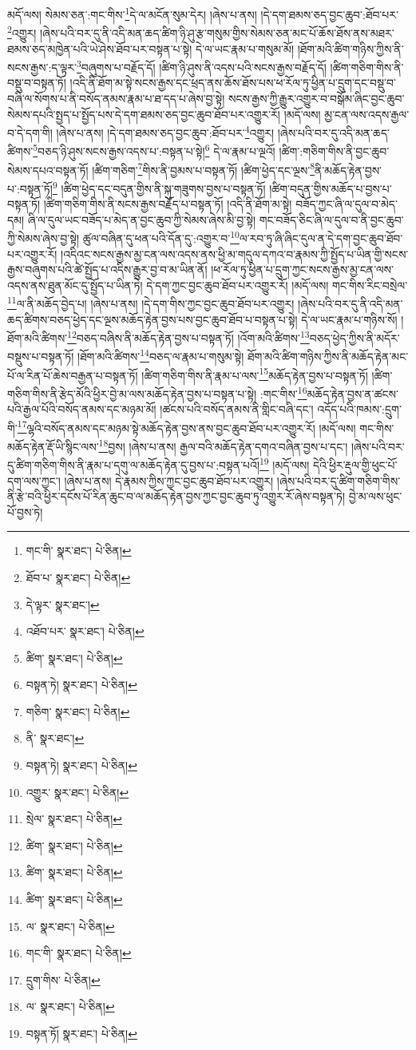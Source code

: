 མདོ་ལས། སེམས་ཅན་:གང་གིས་\footnote{གང་གི་  སྣར་ཐང་།  པེ་ཅིན། }དེ་ལ་མངོན་སུམ་དེར། །ཞེས་པ་ནས། །དེ་དག་ཐམས་ཅད་བྱང་ཆུབ་:ཐོབ་པར་\footnote{ཐོབ་པ་  སྣར་ཐང་།  པེ་ཅིན། }འགྱུར། །ཞེས་པའི་བར་དུ་ནི་འདི་མན་ཆད་ཚིག་ཉི་ཤུ་རྩ་གསུམ་གྱིས་སེམས་ཅན་མང་པོ་ཆོས་ཐོས་ནས་མཐར་ཐམས་ཅད་མཁྱེན་པའི་ཡེ་ཤེས་ཐོབ་པར་བསྟན་པ་སྟེ། དེ་ལ་ཡང་རྣམ་པ་གསུམ་མོ། །ཐོག་མའི་ཚིག་གཉིས་ཀྱིས་ནི་སངས་རྒྱས་:ད་ལྟར་\footnote{དེ་ལྟར་  སྣར་ཐང་། }བཞུགས་པ་བརྗོད་དོ། །ཚིག་ཉི་ཤུས་ནི་འདས་པའི་སངས་རྒྱས་བརྗོད་དོ། །ཚིག་གཅིག་གིས་ནི་བསྡུ་བ་བསྟན་ཏོ། །འདི་ནི་ཐོག་མ་སྟེ་སངས་རྒྱས་དང་ཕྲད་ནས་ཆོས་ཐོས་པས་ཕ་རོལ་ཏུ་ཕྱིན་པ་དྲུག་དང་བསྡུ་བ་བཞི་ལ་སོགས་པ་ནི་བསོད་ནམས་རྣམ་པ་ཐ་དད་པ་ཞེས་བྱ་སྟེ། སངས་རྒྱས་ཀྱི་རྒྱུར་འགྱུར་བ་བསྒོམ་ཞིང་བྱང་ཆུབ་སེམས་དཔའི་སྤྱད་པ་སྤྱོད་པས་དེ་དག་ཐམས་ཅད་བྱང་ཆུབ་ཐོབ་པར་འགྱུར་རོ། །མདོ་ལས། མྱ་ངན་ལས་འདས་རྒྱལ་བ་དེ་དག་གི། །ཞེས་པ་ནས། །དེ་དག་ཐམས་ཅད་བྱང་ཆུབ་:ཐོབ་པར་\footnote{འཐོབ་པར་  སྣར་ཐང་།  པེ་ཅིན། }འགྱུར། །ཞེས་པའི་བར་དུ་འདི་མན་ཆད་ཚིགས་\footnote{ཚིག་  སྣར་ཐང་།  པེ་ཅིན། }བཅད་ཉི་ཤུས་སངས་རྒྱས་འདས་པ་:བསྟན་པ་སྟེ།\footnote{བསྟན་ཏེ།  སྣར་ཐང་།  པེ་ཅིན། } དེ་ལ་རྣམ་པ་ལྔའོ། །ཚིག་:གཅིག་གིས་ནི་བྱང་ཆུབ་སེམས་དཔའ་བསྟན་ཏོ། །ཚིག་གཅིག་\footnote{གཅིག་  སྣར་ཐང་།  པེ་ཅིན། }གིས་ནི་བྱམས་པ་བསྟན་ཏོ། །ཚིག་ཕྱེད་དང་ལྔས་\footnote{ནི་  སྣར་ཐང་། }ནི་མཆོད་རྟེན་བྱས་པ་:བསྟན་ཏོ།\footnote{བསྟན་ཏེ།  སྣར་ཐང་།  པེ་ཅིན། } །ཚིག་ཕྱེད་དང་བདུན་གྱིས་ནི་སྐུ་གཟུགས་བྱས་པ་བསྟན་ཏོ། །ཚིག་བདུན་གྱིས་མཆོད་པ་བྱས་པ་བསྟན་ཏོ། །ཚིག་གཅིག་གིས་ནི་སངས་རྒྱས་བརྗོད་པ་བསྟན་ཏོ། །འདི་ནི་ཐོག་མ་སྟེ། བཟོད་ཀྱང་ཞི་ལ་དུལ་བ་མེད་དམ། ཞི་ལ་དུལ་ཡང་བཟོད་པ་མེད་ན་བྱང་ཆུབ་ཀྱི་སེམས་ཞེས་མི་བྱ་སྟེ། གང་བཟོད་ཅིང་ཞི་ལ་དུལ་བ་ནི་བྱང་ཆུབ་ཀྱི་སེམས་ཞེས་བྱ་སྟེ། ཚུལ་བཞིན་དུ་ཕན་པའི་དོན་དུ་:འགྱུར་བ་\footnote{འགྱུར་  སྣར་ཐང་།  པེ་ཅིན། }ལ་རབ་ཏུ་ཞི་ཞིང་དུལ་ན་དེ་དག་བྱང་ཆུབ་ཐོབ་པར་འགྱུར་རོ། །འདིའང་སངས་རྒྱས་མྱ་ངན་ལས་འདས་ནས་ཕྱི་མ་གདུལ་དཀའ་བ་རྣམས་ཀྱི་སྤྱོད་པ་ཡིན་གྱི་སངས་རྒྱས་བཞུགས་པའི་ཚེ་སྤྱོད་པ་འདིས་རྒྱུར་བྱ་བ་མ་ཡིན་ནོ། །ཕ་རོལ་ཏུ་ཕྱིན་པ་དྲུག་ཀྱང་སངས་རྒྱས་མྱ་ངན་ལས་འདས་ནས་ཐུན་མོང་དུ་སྤྱོད་པ་ཡིན་ཏེ། དེ་དག་ཀྱང་བྱང་ཆུབ་ཐོབ་པར་འགྱུར་རོ། །མདོ་ལས། གང་གིས་རིང་བསྲེལ་\footnote{སྲེལ་  སྣར་ཐང་།  པེ་ཅིན། }ལ་ནི་མཆོད་བྱེད་པ། །ཞེས་པ་ནས། །དེ་དག་གིས་ཀྱང་བྱང་ཆུབ་ཐོབ་པར་འགྱུར། །ཞེས་པའི་བར་དུ་ནི་འདི་མན་ཆད་ཚིགས་བཅད་ཕྱེད་དང་ལྔས་མཆོད་རྟེན་བྱས་པས་བྱང་ཆུབ་ཐོབ་པ་བསྟན་པ་སྟེ། དེ་ལ་ཡང་རྣམ་པ་གཉིས་སོ། །ཐོག་མའི་ཚིགས་\footnote{ཚིག་  སྣར་ཐང་།  པེ་ཅིན། }བཅད་བཞིས་ནི་མཆོད་རྟེན་བྱས་པ་བསྟན་ཏོ། །འོག་མའི་ཚིགས་\footnote{ཚིག་  སྣར་ཐང་།  པེ་ཅིན། }བཅད་ཕྱེད་ཀྱིས་ནི་མདོར་བསྡུས་པ་བསྟན་ཏོ། །ཐོག་མའི་ཚིགས་\footnote{ཚིག་  སྣར་ཐང་།  པེ་ཅིན། }བཅད་ལ་རྣམ་པ་གསུམ་སྟེ། ཐོག་མའི་ཚིག་གཉིས་ཀྱིས་ནི་མཆོད་རྟེན་མང་པོ་ལ་རིན་པོ་ཆེས་བརྒྱན་པ་བསྟན་ཏོ། །ཚིག་གཅིག་གིས་ནི་རྣམ་པ་ལས་\footnote{ལ་  སྣར་ཐང་།  པེ་ཅིན། }མཆོད་རྟེན་བྱས་པ་བསྟན་ཏོ། །ཚིག་གཅིག་གིས་ནི་རྩེད་མོའི་ཕྱིར་བྱེ་མ་ལས་མཆོད་རྟེན་བྱས་པ་བསྟན་པ་སྟེ། :གང་གིས་\footnote{གང་གི་  སྣར་ཐང་།  པེ་ཅིན། }མཆོད་རྟེན་བྱས་ན་ཚངས་པའི་རྒྱལ་པོའི་བསོད་ནམས་དང་མཉམ་མོ། །ཚངས་པའི་བསོད་ནམས་ནི་གླིང་བཞི་དང་། འདོད་པའི་ཁམས་:དྲུག་གི་\footnote{དྲུག་གིས་  པེ་ཅིན། }ལྷའི་བསོད་ནམས་དང་མཉམ་སྟེ་མཆོད་རྟེན་བྱས་ནས་བྱང་ཆུབ་ཐོབ་པར་འགྱུར་རོ། །མདོ་ལས། གང་གིས་མཆོད་རྟེན་རྡོ་ཡི་སྙིང་ལས་\footnote{ལ་  སྣར་ཐང་།  པེ་ཅིན། }བྱས། །ཞེས་པ་ནས། རྒྱལ་བའི་མཆོད་རྟེན་དགའ་བཞིན་བྱས་པ་དང་། །ཞེས་པའི་བར་དུ་ཚིག་གཅིག་གིས་ནི་རྣམ་པ་དགུ་ལ་མཆོད་རྟེན་དུ་བྱས་པ་:བསྟན་པའོ།\footnote{བསྟན་ཏོ།  སྣར་ཐང་།  པེ་ཅིན། } །མདོ་ལས། དེའི་ཕྱིར་རྡུལ་གྱི་ཕུང་པོ་དག་ལས་ཀྱང་། །ཞེས་པ་ནས། དེ་རྣམས་ཀྱིས་ཀྱང་བྱང་ཆུབ་ཐོབ་པར་འགྱུར། །ཞེས་པའི་བར་དུ་ཚིག་གཅིག་གིས་ནི་རྩེ་བའི་ཕྱིར་དངོས་པོ་རིན་ཆུང་བ་ལ་མཆོད་རྟེན་བྱས་ཀྱང་བྱང་ཆུབ་ཏུ་འགྱུར་རོ་ཞེས་བསྟན་ཏེ། བྱེ་མ་ལས་ཕུང་པོ་བྱས་ཏེ། 